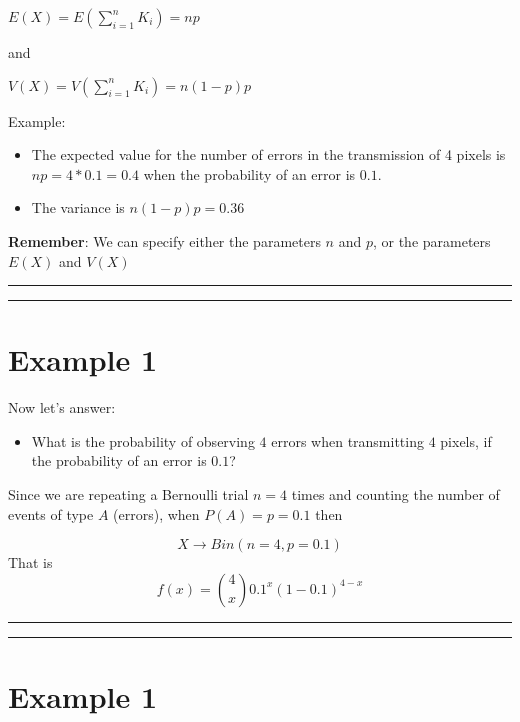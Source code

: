 \documentclass[
]{book}
\providecommand{\tightlist}{%
  \setlength{\itemsep}{0pt}\setlength{\parskip}{0pt}}
\begin{document}
\(E(X)=E(\sum_{i=1}^n K_i)=np\)

and

\(V(X)=V(\sum_{i=1}^n K_i)=n(1-p)p\)

Example:

\begin{itemize}
\item
  The expected value for the number of errors in the transmission of 4 pixels is \(np=4*0.1=0.4\) when the probability of an error is \(0.1\).
\item
  The variance is \(n(1-p)p=0.36\)
\end{itemize}

\textbf{Remember}: We can specify either the parameters \(n\) and \(p\), or the parameters \(E(X)\) and \(V(X)\)

\begin{center}\rule{0.5\linewidth}{0.5pt}\end{center}

\begin{center}\rule{0.5\linewidth}{0.5pt}\end{center}

\hypertarget{example-1-1}{%
\section{Example 1}\label{example-1-1}}

Now let's answer:

\begin{itemize}
\tightlist
\item
  What is the probability of observing \(4\) errors when transmitting \(4\) pixels, if the probability of an error is \(0.1\)?
\end{itemize}

Since we are repeating a Bernoulli trial \(n=4\) times and counting the number of events of type \(A\) (errors), when \(P(A)=p=0.1\) then

\[X \rightarrow Bin(n=4, p=0.1)\]
That is \[f(x)=\binom 4 x 0.1^x(1-0.1)^{4-x}\]

\begin{center}\rule{0.5\linewidth}{0.5pt}\end{center}

\begin{center}\rule{0.5\linewidth}{0.5pt}\end{center}

\hypertarget{example-1-2}{%
\section{Example 1}\label{example-1-2}}
\end{document}
